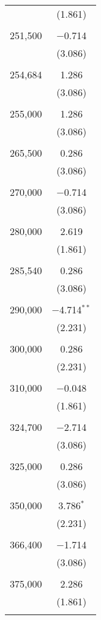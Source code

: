 \documentclass[12pt,english]{article}
\begin{document}
\begin{table}[!htbp]
\begin{tabular}{@{\extracolsep{5pt}}lc}
  & (1.861) \\ 
  & \\ 
 251,500 & $-$0.714 \\ 
  & (3.086) \\ 
  & \\ 
 254,684 & 1.286 \\ 
  & (3.086) \\ 
  & \\ 
 255,000 & 1.286 \\ 
  & (3.086) \\ 
  & \\ 
 265,500 & 0.286 \\ 
  & (3.086) \\ 
  & \\ 
 270,000 & $-$0.714 \\ 
  & (3.086) \\ 
  & \\ 
 280,000 & 2.619 \\ 
  & (1.861) \\ 
  & \\ 
 285,540 & 0.286 \\ 
  & (3.086) \\ 
  & \\ 
 290,000 & $-$4.714$^{**}$ \\ 
  & (2.231) \\ 
  & \\ 
 300,000 & 0.286 \\ 
  & (2.231) \\ 
  & \\ 
 310,000 & $-$0.048 \\ 
  & (1.861) \\ 
  & \\ 
 324,700 & $-$2.714 \\ 
  & (3.086) \\ 
  & \\ 
 325,000 & 0.286 \\ 
  & (3.086) \\ 
  & \\ 
 350,000 & 3.786$^{*}$ \\ 
  & (2.231) \\ 
  & \\ 
 366,400 & $-$1.714 \\ 
  & (3.086) \\ 
  & \\ 
 375,000 & 2.286 \\ 
  & (1.861) \\ 
  & \\ 

\end{tabular}
\end{table}
\end{document}

